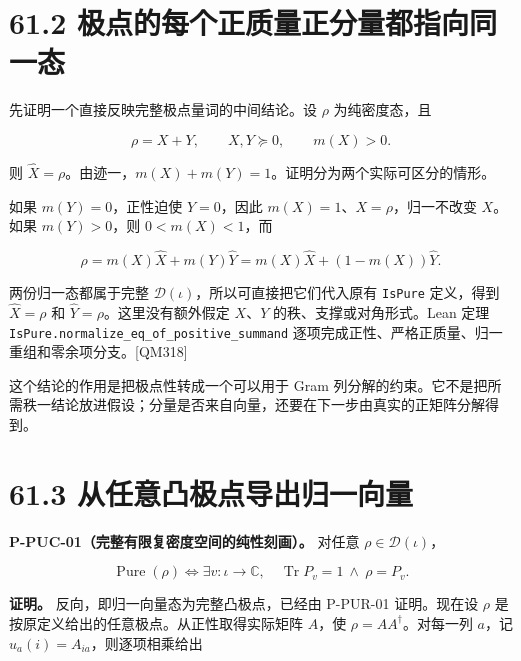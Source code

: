\documentclass[
  11pt,
  oneside]{book}
\begin{document}
\hypertarget{ux6781ux70b9ux7684ux6bcfux4e2aux6b63ux8d28ux91cfux6b63ux5206ux91cfux90fdux6307ux5411ux540cux4e00ux6001}{%
\section{61.2
极点的每个正质量正分量都指向同一态}\label{ux6781ux70b9ux7684ux6bcfux4e2aux6b63ux8d28ux91cfux6b63ux5206ux91cfux90fdux6307ux5411ux540cux4e00ux6001}}

先证明一个直接反映完整极点量词的中间结论。设 \(\rho\) 为纯密度态，且

\[
\rho=X+Y,\qquad X,Y\succeq0,\qquad m(X)>0.
\]

则
\(\widehat X=\rho\)。由迹一，\(m(X)+m(Y)=1\)。证明分为两个实际可区分的情形。

如果 \(m(Y)=0\)，正性迫使 \(Y=0\)，因此
\(m(X)=1\)、\(X=\rho\)，归一不改变 \(X\)。如果 \(m(Y)>0\)，则
\(0<m(X)<1\)，而

\[
\rho=m(X)\widehat X+m(Y)\widehat Y
=m(X)\widehat X+(1-m(X))\widehat Y.
\]

两份归一态都属于完整 \(\mathcal D(\iota)\)，所以可直接把它们代入原有
\texttt{IsPure} 定义，得到 \(\widehat X=\rho\) 和
\(\widehat Y=\rho\)。这里没有额外假定 \(X\)、\(Y\)
的秩、支撑或对角形式。Lean 定理
\texttt{IsPure.normalize\_\allowbreak eq\_\allowbreak of\_\allowbreak positive\_\allowbreak summand}
逐项完成正性、严格正质量、归一重组和零余项分支。{[}QM318{]}

这个结论的作用是把极点性转成一个可以用于 Gram
列分解的约束。它不是把所需秩一结论放进假设；分量是否来自向量，还要在下一步由真实的正矩阵分解得到。

\hypertarget{ux4eceux4efbux610fux51f8ux6781ux70b9ux5bfcux51faux5f52ux4e00ux5411ux91cf}{%
\section{61.3
从任意凸极点导出归一向量}\label{ux4eceux4efbux610fux51f8ux6781ux70b9ux5bfcux51faux5f52ux4e00ux5411ux91cf}}

\protect\hypertarget{p-puc-01}{}{}

\textbf{P-PUC-01（完整有限复密度空间的纯性刻画）。} 对任意
\(\rho\in\mathcal D(\iota)\)，

\[
\operatorname{Pure}(\rho)
\iff
\exists v:\iota\to\mathbb C,\quad
\operatorname{Tr}P_v=1\ \land\ \rho=P_v.
\]

\textbf{证明。} 反向，即归一向量态为完整凸极点，已经由 P-PUR-01
证明。现在设 \(\rho\) 是按原定义给出的任意极点。从正性取得实际矩阵
\(A\)，使 \(\rho=AA^\dagger\)。对每一列 \(a\)，记
\(u_a(i)=A_{ia}\)，则逐项相乘给出
\end{document}

